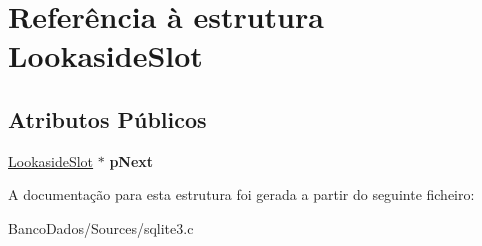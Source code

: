 \hypertarget{struct_lookaside_slot}{\section{Referência à estrutura Lookaside\-Slot}
\label{struct_lookaside_slot}
}
\subsection*{Atributos Públicos}
\begin{DoxyCompactItemize}
\item 
\hypertarget{struct_lookaside_slot_a3c3dd4a770ded51a68e8a651eba40f66}{\hyperlink{struct_lookaside_slot}{Lookaside\-Slot} $\ast$ {\bfseries p\-Next}}\label{struct_lookaside_slot_a3c3dd4a770ded51a68e8a651eba40f66}

\end{DoxyCompactItemize}


A documentação para esta estrutura foi gerada a partir do seguinte ficheiro\-:\begin{DoxyCompactItemize}
\item 
Banco\-Dados/\-Sources/sqlite3.\-c\end{DoxyCompactItemize}
